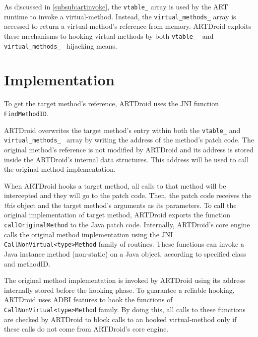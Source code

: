 %	



As discussed in \ref{subsub:artinvoke}, the {\tt vtable\_} array is used by the ART runtime to invoke a virtual-method. Instead, the {\tt virtual\_methods\_} array is accessed to return a virtual-method’s reference from memory. ARTDroid exploits these mechanisms to hooking virtual-methods by both {\tt vtable\_ } and {\tt virtual\_methods\_ } hijacking means.



\section{Implementation}
\label{sec:impl}
To get the target method's reference, ARTDroid uses the JNI  function {\tt FindMethodID}. 


ARTDroid overwrites the target method's entry within both the {\tt vtable\_} and {\tt virtual\_methods\_ } array by writing the address of the method's patch code. The original method's reference is not modified by ARTDroid and its address is stored inside the ARTDroid's internal data structures. This address will be used to call the original method implementation. 


When ARTDroid hooks a target method, all calls to that method will be intercepted and they will go to the patch code. Then, the patch code receives the \textit{this} object and the target method's arguments as its parameters. To call the original implementation of target method, ARTDroid exports the function {\tt callOriginalMethod} to the Java patch code. Internally, ARTDroid's core engine calls the original method implementation using the JNI {\tt CallNonVirtual<type>Method} family of routines. These functions can invoke a Java instance method (non-static) on a Java object, according to specified class and methodID.

The original method implementation is invoked by ARTDroid using its address internally stored  before the hooking phase. To guarantee a reliable hooking, ARTDroid uses ADBI features to hook the functions of {\tt CallNonVirtual<type>Method} family. By doing this, all calls to these functions are checked by ARTDroid to block calls to an hooked virtual-method only if these calls do not come from ARTDroid's core engine.


